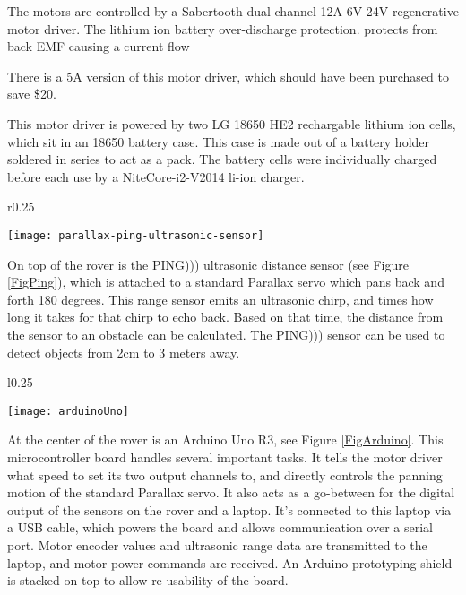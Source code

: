 The motors are controlled by a Sabertooth dual-channel 12A 6V-24V regenerative motor driver. The lithium ion battery over-discharge protection.
protects from back EMF causing a current flow

There is a 5A version of this motor driver, which should have been purchased to save \$20.

This motor driver is powered by two LG 18650 HE2 rechargable lithium ion cells, which sit in an 18650 battery case. This case is made out of a battery holder soldered in series to act as a pack. The battery cells were individually charged before each use by a NiteCore-i2-V2014 li-ion charger.

\begin{wrapfigure}{r}{0.25\textwidth} %
	\caption{PING))) Ultrasonic Sensor \cite{fig_ping}}
	\centering
	\texttt{[image: parallax-ping-ultrasonic-sensor]}
	\label{FigPing}
\end{wrapfigure}

On top of the rover is the PING))) ultrasonic distance sensor (see Figure \ref{FigPing}), which is attached to a standard Parallax servo which pans back and forth 180 degrees. This range sensor emits an ultrasonic chirp, and times how long it takes for that chirp to echo back. Based on that time, the distance from the sensor to an obstacle can be calculated. The PING))) sensor can be used to detect objects from 2cm to 3 meters away. \cite{pingDocumentation}

\begin{wrapfigure}{l}{0.25\textwidth}
	\caption{Arduino Uno R3 \cite{fig_arduino_uno}}
	\centering
	\texttt{[image: arduinoUno]}
	\label{FigArduino}
\end{wrapfigure}

At the center of the rover is an Arduino Uno R3, see Figure \ref{FigArduino}. This microcontroller board handles several important tasks. It tells the motor driver what speed to set its two output channels to, and directly controls the panning motion of the standard Parallax servo. It also acts as a go-between for the digital output of the sensors on the rover and a laptop. It's connected to this laptop via a USB cable, which powers the board and allows communication over a serial port. Motor encoder values and ultrasonic range data are transmitted to the laptop, and motor power commands are received. An Arduino prototyping shield is stacked on top to allow re-usability of the board.

